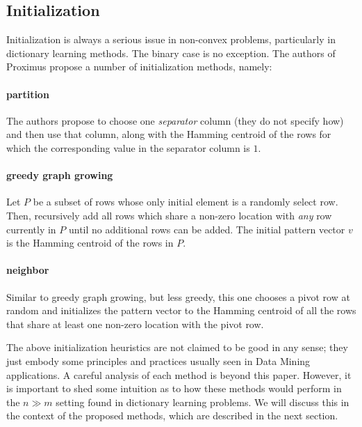 \documentclass[a4paper]{IEEEtran}
\begin{document}
\subsection{Initialization}

Initialization is always a serious issue in non-convex problems, particularly in dictionary learning methods. The binary case is no exception. The authors of Proximus propose a number of initialization methods, namely: 

\paragraph{partition} The authors propose to choose one \emph{separator} column (they do not specify how) and then use that column, along with the Hamming centroid of the rows for which the corresponding value in the separator column is $1$.
\paragraph{greedy graph growing} Let $P$ be a subset of rows whose only initial element is a randomly select row. Then, recursively add all rows which share a non-zero location with \emph{any} row currently in $P$ until no additional rows can be added. The initial pattern vector $v$ is the Hamming centroid of the rows in $P$.
\paragraph{neighbor} Similar to greedy graph growing, but less greedy, this one chooses a pivot row at random and initializes the pattern vector to the Hamming centroid of all the rows that share at least one non-zero location with the pivot row.

The above initialization heuristics are not claimed to be good in any sense; they just embody some principles and practices usually seen in Data Mining applications. A careful analysis of each method is beyond this paper. However, it is important to shed some intuition as to how these methods would perform in the $n \gg m$ setting found in dictionary learning problems. We will discuss this in the context of the proposed methods, which are described in the next section.
\end{document}
